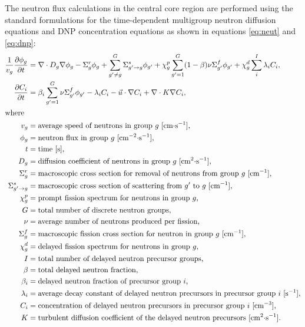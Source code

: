 The neutron flux calculations in the central core region are
performed using the standard formulations for the time-dependent multigroup
neutron diffusion equations and \gls{DNP} concentration equations as shown in
equations \ref{eq:neut} and \ref{eq:dnp}:
%
\begin{align}
    \frac{1}{v_g} \frac{\partial \phi_g}{\partial t} &= \nabla \cdot D_g
    \nabla \phi_g - \Sigma^r_g \phi_g +
    \sum^G_{g' \neq g} \Sigma^s_{g' \rightarrow g} \phi_{g'} + \chi^p_g
    \sum^G_{g'=1} (1-\beta) \nu \Sigma^f_{g'} \phi_{g'} + \chi^d_g \sum^I_i
    \lambda_i C_i, \label{eq:neut} \\
    \frac{\partial C_i}{\partial t} &= \beta_i \sum^G_{g'=1} \nu \Sigma^f_{g'}
    \phi_{g'} - \lambda_i C_i - \vec{u} \cdot \nabla C_i + \nabla \cdot
    K \nabla C_i, \label{eq:dnp} \\
    \intertext{where}
    v_g &= \text{average speed of neutrons in group $g$ [cm$\cdot$s$^{-1}$],} 
    \nonumber \\
    \phi_g &= \text{neutron flux in group $g$ [cm$^{-2}\cdot$s$^{-1}$],}
    \nonumber \\
    t &= \text{time [s],} \nonumber \\
    D_g &= \text{diffusion coefficient of neutrons in group $g$
    [cm$^2\cdot$s$^{-1}$],} \nonumber \\
    \Sigma^r_g &= \text{macroscopic cross section for removal of neutrons from
    group $g$ [cm$^{-1}$],} \nonumber \\
    \Sigma^s_{g' \rightarrow g} &= \text{macroscopic cross section of
    scattering from $g'$ to $g$ [cm$^{-1}$],} \nonumber \\
    \chi^p_g &= \text{prompt fission spectrum for neutrons in group $g$,}
    \nonumber \\
    G &= \text{total number of discrete neutron groups,} \nonumber \\
    \nu &= \text{average number of neutrons produced per fission,} \nonumber
    \\
    \Sigma^f_{g} &= \text{macroscopic fission cross section for neutron in
    group $g$ [cm$^{-1}$],} \nonumber \\
    \chi^d_g &= \text{delayed fission spectrum for neutrons in group $g$,}
    \nonumber \\
    I &= \text{total number of delayed neutron precursor groups,} \nonumber \\
    \beta &= \text{total delayed neutron fraction,} \nonumber \\
    \beta_i &= \text{delayed neutron fraction of precursor group $i$,}
    \nonumber \\
    \lambda_i &= \text{average decay constant of delayed neutron precursors in
    precursor group $i$ [s$^{-1}$],} \nonumber \\
    C_i &= \text{concentration of delayed neutron precursors in precursor
    group $i$ [cm$^{-3}$],} \nonumber \\
    K &= \text{turbulent diffusion coefficient of the delayed neutron
    precursors [cm$^2\cdot$s$^{-1}$].} \nonumber
\end{align}
%

